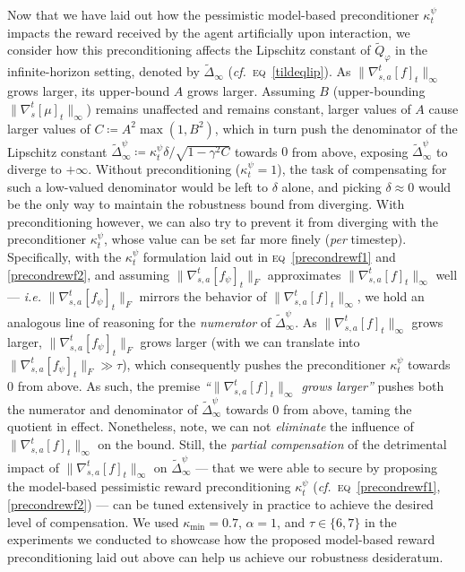 Now that we have laid out how the pessimistic model-based preconditioner $\kappa_t^\psi$ impacts the reward
received by the agent artificially upon interaction, we consider how this preconditioning affects the
Lipschitz constant of $\widetilde{Q}_\varphi$ in the infinite-horizon setting,
denoted by $\widetilde{\Delta}_\infty$ (\textit{cf.}~\textsc{eq}~\ref{tildeqlip}).
As $\lVert\nabla_{s,a}^t[f]_t\rVert _\infty$ grows larger,
its upper-bound $A$ grows larger.
Assuming $B$ (upper-bounding $\lVert\nabla_s^t[\mu]_t\rVert _\infty$) remains unaffected and remains constant,
larger values of $A$ cause larger values of $C \coloneqq A^2 \max(1, B^2)$,
which in turn push the denominator of the Lipschitz constant
$\widetilde{\Delta}_\infty^\psi \coloneqq \kappa_t^\psi \delta / \sqrt{1 - \gamma^2 C}$
towards $0$ from above,
exposing $\widetilde{\Delta}_\infty^\psi$ to diverge to $+\infty$.
Without preconditioning
($\kappa_t^\psi = 1$),
the task of compensating for such a low-valued denominator would be left to $\delta$ alone,
and picking $\delta \approx 0$ would be the only way to maintain the robustness bound from diverging.
With preconditioning however, we can also try to prevent it from diverging with
the preconditioner $\kappa_t^\psi$, whose value can be set far more finely (\emph{per} timestep).
Specifically, with the $\kappa_t^\psi$ formulation laid out in \textsc{eq}~\ref{precondrewf1} and \ref{precondrewf2},
and assuming $\lVert\nabla_{s,a}^t[f_\psi]_t\rVert _F$ approximates
$\lVert\nabla_{s,a}^t[f]_t\rVert _\infty$ well
--- \textit{i.e.} $\lVert\nabla_{s,a}^t[f_\psi]_t\rVert _F$
mirrors the behavior of $\lVert\nabla_{s,a}^t[f]_t\rVert _\infty$,
we hold an analogous line of reasoning for the \emph{numerator} of $\widetilde{\Delta}_\infty^\psi$.
As $\lVert\nabla_{s,a}^t[f]_t\rVert _\infty$ grows larger,
$\lVert\nabla_{s,a}^t[f_\psi]_t\rVert _F$ grows larger
(with we can translate into $\lVert\nabla_{s,a}^t[f_\psi]_t\rVert _F \gg \tau$),
which consequently pushes the preconditioner $\kappa_t^\psi$
towards $0$ from above.
As such, the premise \textit{``$\lVert\nabla_{s,a}^t[f]_t\rVert _\infty$ grows larger''}
pushes both the numerator and denominator of $\widetilde{\Delta}_\infty^\psi$ towards $0$ from above,
taming the quotient in effect.
Nonetheless, note, we can not \emph{eliminate} the influence of $\lVert\nabla_{s,a}^t[f]_t\rVert _\infty$ on the bound.
Still, the \emph{partial compensation} of the detrimental impact
of $\lVert\nabla_{s,a}^t[f]_t\rVert _\infty$ on $\widetilde{\Delta}_\infty^\psi$ ---
that we were able to secure by proposing the model-based pessimistic reward preconditioning $\kappa_t^\psi$
(\textit{cf.}~\textsc{eq}~\ref{precondrewf1}, \ref{precondrewf2}) ---
can be tuned extensively in practice
to achieve the desired level of compensation.
We used $\kappa_\text{min} = 0.7$, $\alpha = 1$, and $\tau \in \{6,7\}$ in the experiments
we conducted to showcase how the proposed model-based reward preconditioning laid out above can help us
achieve our robustness desideratum.

